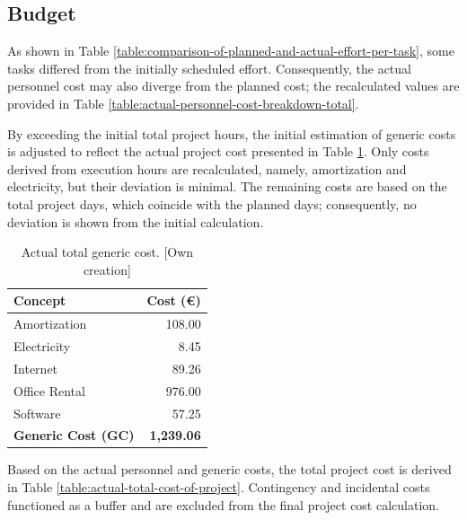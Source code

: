 \subsection{Budget}
\label{sec:actual-budget}

As shown in Table \ref{table:comparison-of-planned-and-actual-effort-per-task}, some tasks differed from the initially scheduled effort. Consequently, the actual personnel cost may also diverge from the planned cost; the recalculated values are provided in Table \ref{table:actual-personnel-cost-breakdown-total}.



By exceeding the initial total project hours, the initial estimation of generic costs is adjusted to reflect the actual project cost presented in Table \ref{tab:actual-total-generic-cost}. Only costs derived from execution hours are recalculated, namely, amortization and electricity, but their deviation is minimal. The remaining costs are based on the total project days, which coincide with the planned days; consequently, no deviation is shown from the initial calculation.

\vspace{-10pt}

\begin{table}[H]
    \renewcommand{\arraystretch}{1}
    \centering
    \footnotesize
    \begin{tabular}{@{}l r@{}}
    \textbf{Concept} & \textbf{Cost (€)} \\ \hline
    Amortization & 108.00  \\
    Electricity & 8.45 \\
    Internet & 89.26 \\
    Office Rental & 976.00 \\
    Software & 57.25 \\
    \hline
    \textbf{Generic Cost (GC)} & \textbf{1,239.06} \\
    \end{tabular}
    \caption[Actual total generic cost]{Actual total generic cost. [Own creation]}
    \label{tab:actual-total-generic-cost}
\end{table}

\vspace{-20pt}

Based on the actual personnel and generic costs, the total project cost is derived in Table \ref{table:actual-total-cost-of-project}. Contingency and incidental costs functioned as a buffer and are excluded from the final project cost calculation.

